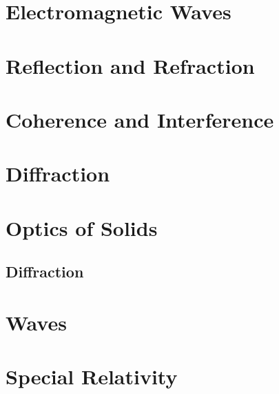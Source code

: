 \documentclass{book}
\begin{document}
\chapter{Electromagnetic Waves}

\chapter{Reflection and Refraction}

\chapter{Coherence and Interference}

\chapter{Diffraction}

\chapter{Optics of Solids}

\section{Diffraction}
\appendix
\begin{comment}
\chapter{Electric Circuits}
\section{Electronics}
\section{DC Current}
\section{AC Current}
\chapter{Magnetic Circuits}
\end{comment}
\chapter{Waves}

\chapter{Special Relativity}

\nocite{griffem,jackson,landau2,zangwillem,fowles,fourieropt}
\printbibliography
\end{document}

